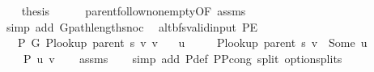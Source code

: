 \begin{isabellebody}
\ \ \isamarkupfalse%
\ {\isacharquery}{\kern0pt}thesis\isanewline
\ \ \ \ \isamarkupfalse%
\ parent{\isachardot}{\kern0pt}follow{\isacharunderscore}{\kern0pt}non{\isacharunderscore}{\kern0pt}empty{\isacharbrackleft}{\kern0pt}OF\ assms{\isacharparenleft}{\kern0pt}{}{\isacharparenright}{\kern0pt}{\isacharbrackright}{\kern0pt}\isanewline
\ \ \ \ \isamarkupfalse%
\ {\isacharparenleft}{\kern0pt}simp\ add{\isacharcolon}{\kern0pt}\ G{\isachardot}{\kern0pt}path{\isacharunderscore}{\kern0pt}length{\isacharunderscore}{\kern0pt}snoc{\isacharparenright}{\kern0pt}\isanewline
{}\isamarkupfalse%
%
\endisatagproof
{\isafoldproof}%
%
\isadelimproof
\isanewline
%
\endisadelimproof
\isanewline
{}\isamarkupfalse%
\ {\isacharparenleft}{\kern0pt}\ alt{\isacharunderscore}{\kern0pt}bfs{\isacharunderscore}{\kern0pt}valid{\isacharunderscore}{\kern0pt}input{\isacharparenright}{\kern0pt}\ P{\isacharprime}{\kern0pt}E{\isacharcolon}{\kern0pt}\isanewline
\ \ \ {\isachardoublequoteopen}P{\isacharprime}{\kern0pt}\ G{}\ {\isacharparenleft}{\kern0pt}P{\isacharunderscore}{\kern0pt}lookup\ {\isacharparenleft}{\kern0pt}parent\ s{\isacharparenright}{\kern0pt}\ v{\isacharparenright}{\kern0pt}\ v{\isachardoublequoteclose}\isanewline
\ \ \ u\ \isanewline
\ \ \ \ {\isachardoublequoteopen}P{\isacharunderscore}{\kern0pt}lookup\ {\isacharparenleft}{\kern0pt}parent\ s{\isacharparenright}{\kern0pt}\ v\ {\isacharequal}{\kern0pt}\ Some\ u{\isachardoublequoteclose}\isanewline
\ \ \ \ {\isachardoublequoteopen}P{\isacharprime}{\kern0pt}{\isacharprime}{\kern0pt}\ {\isacharbraceleft}{\kern0pt}u{\isacharcomma}{\kern0pt}\ v{\isacharbraceright}{\kern0pt}{\isachardoublequoteclose}\isanewline
%
\isadelimproof
\ \ %
\endisadelimproof
%
\isatagproof
{}\isamarkupfalse%
\ assms\isanewline
\ \ \isamarkupfalse%
\ {\isacharparenleft}{\kern0pt}simp\ add{\isacharcolon}{\kern0pt}\ P{\isacharprime}{\kern0pt}{\isacharunderscore}{\kern0pt}def\ P{\isacharunderscore}{\kern0pt}P{\isacharprime}{\kern0pt}{\isacharprime}{\kern0pt}{\isacharunderscore}{\kern0pt}cong\ split{\isacharcolon}{\kern0pt}\ option{\isachardot}{\kern0pt}splits{\isacharparenleft}{\kern0pt}{}{\isacharparenright}{\kern0pt}{\isacharparenright}{\kern0pt}%
\endisatagproof
{\isafoldproof}%
%
\isadelimproof
%
\endisadelimproof
%
\isadelimdocument
%
\endisadelimdocument
%
\isatagdocument
%
\end{isabellebody}
